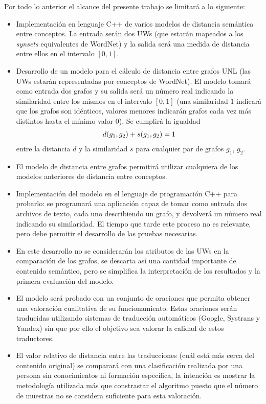\documentclass[a4paper,12pt,spanish]{book}
\begin{document}
Por todo lo anterior el alcance del presente trabajo se limitará a lo siguiente:
\begin{itemize}
\item {} 
Implementación en lenguaje C++ de varios modelos de distancia semántica entre
conceptos. La entrada serán dos UWs (que estarán mapeados a los \emph{synsets}
equivalentes de WordNet) y la salida será una medida de distancia entre ellos
en el intervalo \([0, 1]\).

\item {} 
Desarrollo de un modelo para el cálculo de distancia entre grafos UNL (las UWs
estarán representadas por conceptos de WordNet). El modelo
tomará como entrada dos grafos y su salida será un número real indicando la
similaridad entre los mismos en el intervalo \([0, 1]\) (una similaridad
\(1\) indicará que los grafos son idénticos, valores menores indicarán
grafos cada vez más distintos hasta el mínimo valor \(0\)).
Se cumplirá la igualdad
\begin{gather}
\begin{split}d(g_1, g_2) + s(g_1, g_2) = 1\end{split}\notag
\end{gather}
entre la distancia \(d\) y la similaridad \(s\) para cualquier par de grafos
\(g_1\), \(g_2\).

\item {} 
El modelo de distancia entre grafos permitirá utilizar cualquiera de los modelos
anteriores de distancia entre conceptos.

\item {} 
Implementación del modelo en el lenguaje de programación C++ para probarlo: se
programará una aplicación capaz de tomar como entrada dos archivos de texto, cada uno
describiendo un grafo, y devolverá un número real indicando su similaridad. El
tiempo que tarde este proceso no es relevante, pero debe permitir el desarrollo
de las pruebas necesarias.

\item {} 
En este desarrollo no se considerarán los atributos de las UWs en la
comparación de los grafos, se descarta así una cantidad importante de contenido
semántico, pero se simplifica la interpretación de los resultados y la primera
evaluación del modelo.

\item {} 
El modelo será probado con un conjunto de oraciones que permita obtener una
valoración cualitativa de su funcionamiento. Estas oraciones serán traducidas
utilizando sistemas de traducción automáticos (Google, Systrans y Yandex) sin que
por ello el objetivo sea valorar la calidad de estos traductores.

\item {} 
El valor relativo de distancia entre las traducciones (cuál está más cerca del
contenido original) se comparará con una clasificación realizada por una persona
sin conocimientos ni formación específica, la intención es mostrar la metodología
utilizada más que constrastar el algoritmo puesto que el número de muestras no
se considera suficiente para esta valoración.

\end{itemize}
\end{document}
